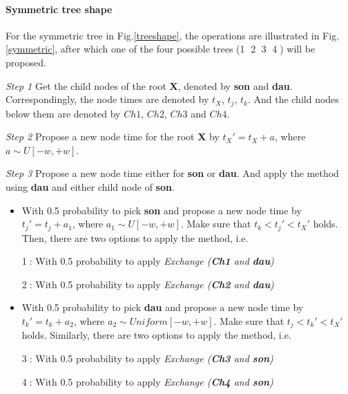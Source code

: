 \documentclass{bmcart}
\begin{document}
\paragraph*{Symmetric tree shape}

For the symmetric tree in Fig.\ref{treeshape}, the operations are illustrated in Fig.\ref{symmetric}, after which one of the four possible trees (\textcircled1 \textcircled2 \textcircled3 \textcircled4) will be proposed.

\emph{Step 1} Get the child nodes of the root \textbf{X}, denoted by \textbf{son} and \textbf{dau}. Correspondingly, the node times are denoted by $t_X$, $t_j$, $t_k$. And the child nodes below them are denoted by $Ch1$, $Ch2$, $Ch3$ and $Ch4$. 

\emph{Step 2} Propose a new node time for the root \textbf{X} by ${t_X}' = {t_X} + a$, where $a \sim U[ - w, + w]$.

\emph{Step 3} Propose a new node time either for \textbf{son} or \textbf{dau}. And apply the method using \textbf{dau} and either child node of \textbf{son}.
\begin{itemize}
\item With 0.5 probability to pick \textbf{son} and propose a new node time by ${t_j}' = {t_j} + {a_1}$, where ${a_1} \sim U[ - w, + w]$. Make sure that ${t_k} < {t_j}' < {t_X}'$ holds. Then, there are two options to apply the method, i.e.

\textcircled1: With 0.5 probability to apply \textit{Exchange (\textbf{Ch1} and \textbf{dau})}

\textcircled2: With 0.5 probability to apply \textit{Exchange (\textbf{Ch2} and \textbf{dau})}

\item With 0.5 probability to pick \textbf{dau} and propose a new node time by ${t_k}' = {t_k} + {a_2}$, where ${a_2} \sim Uniform[ - w, + w]$. Make sure that ${t_j} < {t_k}' < {t_X}'$ holds. Similarly, there are two options to apply the method, i.e.

\textcircled3: With 0.5 probability to apply \textit{Exchange (\textbf{Ch3} and \textbf{son})}

\textcircled4: With 0.5 probability to apply \textit{Exchange (\textbf{Ch4} and \textbf{son})}
\end{itemize}
\end{document}
